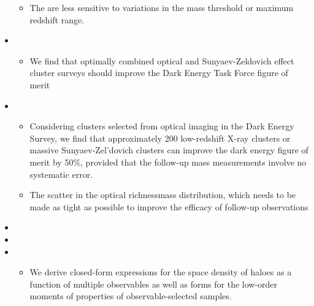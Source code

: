 \documentclass[letterpaper,10pt,english]{sphinxmanual}
\begin{document}
\begin{itemize}
\begin{itemize}
\item {} 
The  are less sensitive to
variations in the mass threshold or maximum redshift range.

\end{itemize}

\item {} 
\begin{itemize}
\item {} 
We find that optimally combined optical and Sunyaev-Zeldovich
effect cluster surveys should improve the Dark Energy Task Force
figure of merit

\end{itemize}

\item {} 
\begin{itemize}
\item {} 
Considering clusters selected from optical imaging in the Dark
Energy Survey, we find that approximately 200 low-redshift X-ray
clusters or massive Sunyaev-Zel’dovich clusters can improve the
dark energy figure of merit by 50\%, provided that the follow-up
mass measurements involve no systematic error.

\item {} 
The scatter in the optical richness\textendash{}mass distribution, which needs
to be made as tight as possible to improve the efficacy of
follow-up observations

\end{itemize}

\item {} 

\item {} 

\item {} 
\begin{itemize}
\item {} 
We derive closed-form expressions for the space density of haloes
as a function of multiple observables as well as forms for the
low-order moments of properties of observable-selected samples.

\end{itemize}

\end{itemize}
\end{document}
